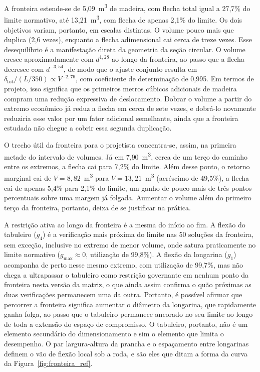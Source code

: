 A fronteira estende-se de 5{,}09~m\textsuperscript{3} de madeira, com flecha total igual a 27{,}7\% do limite normativo, até 13{,}21~m\textsuperscript{3}, com flecha de apenas 2{,}1\% do limite.
Os dois objetivos variam, portanto, em escalas distintas. O volume pouco mais que duplica (2{,}6 vezes), enquanto a flecha adimensional cai cerca de treze vezes.
Esse desequilíbrio é a manifestação direta da geometria da seção circular.
O volume cresce aproximadamente com $d^{1{,}28}$ ao longo da fronteira, ao passo que a flecha decresce com $d^{-3{,}54}$, de modo que o ajuste conjunto resulta em $\delta_{\mathrm{tot}}/(L/350) \propto V^{-2{,}76}$, com coeficiente de determinação de 0{,}995.
Em termos de projeto, isso significa que os primeiros metros cúbicos adicionais de madeira compram uma redução expressiva de deslocamento. Dobrar o volume a partir do extremo econômico já reduz a flecha em cerca de sete vezes, e dobrá-lo novamente reduziria esse valor por um fator adicional semelhante, ainda que a fronteira estudada não chegue a cobrir essa segunda duplicação.

O trecho útil da fronteira para o projetista concentra-se, assim, na primeira metade do intervalo de volumes. Já em 7{,}90~m\textsuperscript{3}, cerca de um terço do caminho entre os extremos, a flecha cai para 7{,}2\% do limite. Além desse ponto, o retorno marginal cai de $V = 8{,}82$~m\textsuperscript{3} para $V = 13{,}21$~m\textsuperscript{3} (acréscimo de 49{,}5\%), a flecha cai de apenas 5{,}4\% para 2{,}1\% do limite, um ganho de pouco mais de três pontos percentuais sobre uma margem já folgada. Aumentar o volume além do primeiro terço da fronteira, portanto, deixa de se justificar na prática.


A restrição ativa ao longo da fronteira é a mesma do início ao fim.
A flexão do tabuleiro ($g_4$) é a verificação mais próxima do limite nas 50 soluções da fronteira, sem exceção, inclusive no extremo de menor volume, onde satura praticamente no limite normativo ($g_{\max} \approx 0$, utilização de 99{,}8\%).
A flexão da longarina ($g_1$) acompanha de perto nesse mesmo extremo, com utilização de 99{,}7\%, mas não chega a ultrapassar o tabuleiro como restrição governante em nenhum ponto da fronteira nesta versão da matriz, o que ainda assim confirma o quão próximas as duas verificações permanecem uma da outra.
Portanto, é possível afirmar que percorrer a fronteira significa aumentar o diâmetro da longarina, que rapidamente ganha folga, ao passo que o tabuleiro permanece ancorado no seu limite ao longo de toda a extensão do espaço de compromisso.
O tabuleiro, portanto, não é um elemento secundário do dimensionamento e sim o elemento que limita o desempenho. O par largura-altura da prancha e o espaçamento entre longarinas definem o vão de flexão local sob a roda, e são eles que ditam a forma da curva da Figura~\ref{fig:fronteira_ref}.

